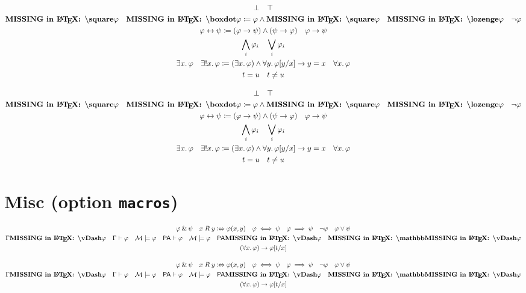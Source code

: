 \documentclass{article}
\begin{document}
\begin{verbatim*}
\begin{gather*}
\lfalse\quad
\ltrue\\
\lbox\varphi\quad
\lboxdot\varphi\coloneqq\varphi\land\lbox\varphi\quad
\ldia\varphi\quad
\lneg\varphi\\
\varphi\lbiimp\psi\coloneqq(\varphi\limp\psi)\land(\psi\limp\varphi)\quad
\varphi\limp\psi\\
\Land_{i}\varphi_{i}\quad
\Lor_{i}\varphi_{i}\\
\lexists x.\,\varphi\quad
\lexistsUnq x.\,\varphi\coloneqq
 (\lexists x.\,\varphi)\land\lforall y.\,\Subst{y}[x]{\varphi}\limp y\lEQ x\quad
\lforall x.\,\varphi\\
t\lEQ u\quad
t\lNEQ u
\end{gather*}
\end{verbatim*}
%
\begin{gather*}
  \lfalse \quad
  \ltrue \\
  \lbox\varphi \quad
  \lboxdot\varphi \coloneqq \varphi \land \lbox\varphi \quad
  \ldia\varphi \quad
  \lneg\varphi \\
  \varphi \lbiimp \psi \coloneqq (\varphi \limp \psi) \land (\psi \limp \varphi) \quad
  \varphi \limp \psi \\
  \Land_{i} \varphi_{i} \quad
  \Lor_{i} \varphi_{i} \\
  \lexists x.\,\varphi \quad
  \lexistsUnq x.\,\varphi \coloneqq (\lexists x.\,\varphi) \land \lforall y.\,\Subst{y}[x]{\varphi} \limp y \lEQ x \quad
  \lforall x.\,\varphi \\
  t \lEQ u \quad
  t \lNEQ u
\end{gather*}

\section{Misc (option \texttt{macros})}

\begin{verbatim*}
\begin{gather*}
\varphi\AND\psi\quad
x\mathrel{R}y\coloniff\varphi(x,y)\quad
\varphi\iff\psi\quad
\varphi\implies\psi\quad
\NOT\varphi\quad
\varphi\OR\psi\\
\Gamma\entailsSem\varphi\quad
\Gamma\entailsSyn\varphi\quad
\Mod[M]\forces\varphi\quad
\mathsf{PA}\proves\varphi\quad
\Mod[M]\satisfies\varphi\quad
\mathsf{PA}\validates\varphi\quad
\Nats\validates\varphi\\
(\lforall x.\,\varphi)\limp\Subst{t}[x]{\varphi}
\end{gather*}
\end{verbatim*}
%
\begin{gather*}
  \varphi \AND \psi \quad
  x \mathrel{R} y \coloniff \varphi(x,y) \quad
  \varphi \iff \psi \quad
  \varphi \implies \psi \quad
  \NOT\varphi \quad
  \varphi \OR \psi \\
  \Gamma \entailsSem \varphi \quad
  \Gamma \entailsSyn \varphi \quad
  \Mod[M] \forces \varphi \quad
  \mathsf{PA} \proves \varphi \quad
  \Mod[M] \satisfies \varphi \quad
  \mathsf{PA} \validates \varphi \quad
  \Nats \validates \varphi \\
  (\lforall x.\,\varphi) \limp \Subst{t}[x]{\varphi}
\end{gather*}
\end{document}
